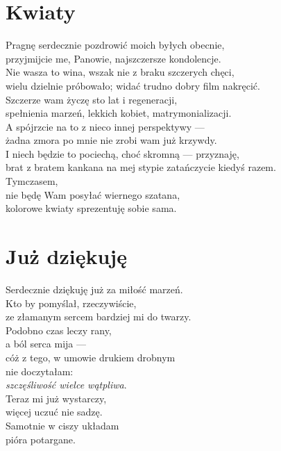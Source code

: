 \documentclass[12pt, a4paper]{memoir}
\renewenvironment{verse}{%
  \par\vspace{\baselineskip}\raggedright
}{
  \par\vspace{\baselineskip}
}
\begin{document}
\section{Kwiaty}

\begin{verse}
Pragnę serdecznie pozdrowić moich byłych obecnie,\\
przyjmijcie me, Panowie, najszczersze kondolencje.\\[\baselineskip]

Nie wasza to wina, wszak nie z braku szczerych chęci,\\
wielu dzielnie próbowało; widać trudno dobry film nakręcić.\\[\baselineskip]

Szczerze wam życzę sto lat i regeneracji,\\
spełnienia marzeń, lekkich kobiet, matrymonializacji.\\[\baselineskip]

A spójrzcie na to z nieco innej perspektywy ---\\
żadna zmora po mnie nie zrobi wam już krzywdy.\\[\baselineskip]

I niech będzie to pociechą, choć skromną --- przyznaję,\\
brat z bratem kankana na mej stypie zatańczycie kiedyś razem.\\[\baselineskip]

Tymczasem,\\
nie będę Wam posyłać wiernego szatana,\\
kolorowe kwiaty sprezentuję sobie sama.
\end{verse}

\clearpage

\section{Już dziękuję}

\begin{verse}
Serdecznie dziękuję już za miłość marzeń.\\
Kto by pomyślał, rzeczywiście,\\
ze złamanym sercem bardziej mi do twarzy.\\[\baselineskip]

Podobno czas leczy rany,\\
a ból serca mija ---\\
cóż z tego, w umowie drukiem drobnym\\
nie doczytałam:\\
\textit{szczęśliwość wielce wątpliwa}.\\[\baselineskip]

Teraz mi już wystarczy,\\
więcej uczuć nie sadzę.\\
Samotnie w ciszy układam\\
pióra potargane.
\end{verse}
\end{document}
